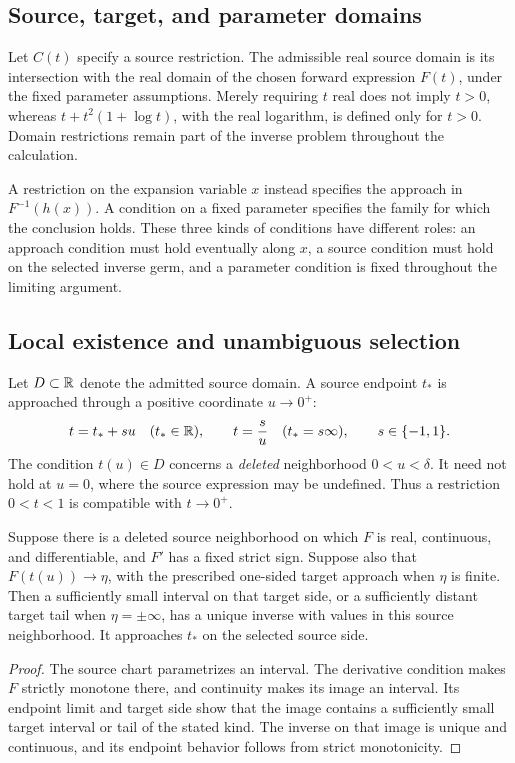 \subsection{Source, target, and parameter domains}

Let $C(t)$ specify a source restriction. The admissible real source domain
is its intersection with the real domain of the chosen forward expression
$F(t)$, under the fixed parameter assumptions. Merely requiring $t$ real
does not imply $t>0$, whereas $t+t^2(1+\log t)$, with the real logarithm,
is defined only for $t>0$. Domain restrictions remain part of the inverse
problem throughout the calculation.

A restriction on the expansion variable $x$ instead specifies the approach
in $F^{-1}(h(x))$. A condition on a fixed parameter specifies the family
for which the conclusion holds. These three kinds of conditions have
different roles: an approach condition must hold eventually along $x$,
a source condition must hold on the selected inverse germ, and a parameter
condition is fixed throughout the limiting argument.

\subsection{Local existence and unambiguous selection}

Let $D\subset\mathbb R$ denote the admitted source domain. A source endpoint
$t_*$ is approached through a positive coordinate $u\to0^+$:
\[
 t=t_*+s u\quad(t_*\in\mathbb R),\qquad
 t=\frac{s}{u}\quad(t_*=s\infty),\qquad s\in\{-1,1\}.
\]
The condition $t(u)\in D$ concerns a \emph{deleted} neighborhood
$0<u<\delta$. It need not hold at $u=0$, where the source expression
may be undefined. Thus a restriction $0<t<1$ is compatible with
$t\to0^+$.

\begin{proposition}
\label{prop:inverse-expression-local-branch}
Suppose there is a deleted source neighborhood on which $F$ is real,
continuous, and differentiable, and $F'$ has a fixed strict sign.
Suppose also that $F(t(u))\to\eta$, with the prescribed one-sided target
approach when $\eta$ is finite. Then a sufficiently small interval on
that target side, or a sufficiently distant target tail when
$\eta=\pm\infty$, has a unique inverse with values in this source
neighborhood. It approaches $t_*$ on the selected source side.
\end{proposition}

\begin{proof}
The source chart parametrizes an interval. The derivative condition
makes $F$ strictly monotone there, and continuity makes its image an
interval. Its endpoint limit and target side show that the image
contains a sufficiently small target interval or tail of the stated
kind. The inverse on that image is unique and continuous, and its
endpoint behavior follows from strict monotonicity.
\end{proof}

